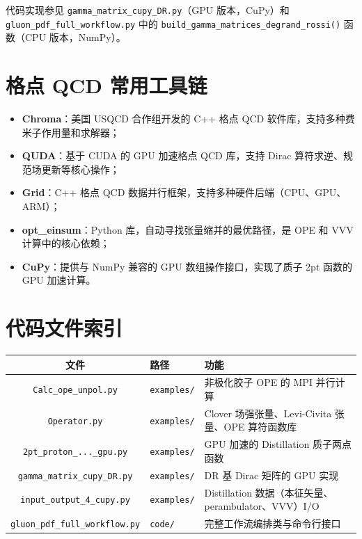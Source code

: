 \documentclass[11pt,a4paper]{ctexart}
\begin{document}
代码实现参见 \texttt{gamma\_matrix\_cupy\_DR.py}（GPU 版本，CuPy）和 \texttt{gluon\_pdf\_full\_workflow.py} 中的 \texttt{build\_gamma\_matrices\_degrand\_rossi()} 函数（CPU 版本，NumPy）。

\section{格点 QCD 常用工具链}

\begin{itemize}
  \item \textbf{Chroma}：美国 USQCD 合作组开发的 C++ 格点 QCD 软件库，支持多种费米子作用量和求解器；
  \item \textbf{QUDA}：基于 CUDA 的 GPU 加速格点 QCD 库，支持 Dirac 算符求逆、规范场更新等核心操作；
  \item \textbf{Grid}：C++ 格点 QCD 数据并行框架，支持多种硬件后端（CPU、GPU、ARM）；
  \item \textbf{opt\_einsum}：Python 库，自动寻找张量缩并的最优路径，是 OPE 和 VVV 计算中的核心依赖；
  \item \textbf{CuPy}：提供与 NumPy 兼容的 GPU 数组操作接口，实现了质子 2pt 函数的 GPU 加速计算。
\end{itemize}

\section{代码文件索引}

\begin{center}
\begin{tabular}{c l p{6cm}}
\toprule
\textbf{文件} & \textbf{路径} & \textbf{功能} \\
\midrule
\texttt{Calc\_ope\_unpol.py} & \texttt{examples/} & 非极化胶子 OPE 的 MPI 并行计算 \\
\texttt{Operator.py} & \texttt{examples/} & Clover 场强张量、Levi-Civita 张量、OPE 算符函数库 \\
\texttt{2pt\_proton\_...\_gpu.py} & \texttt{examples/} & GPU 加速的 Distillation 质子两点函数 \\
\texttt{gamma\_matrix\_cupy\_DR.py} & \texttt{examples/} & DR 基 Dirac 矩阵的 GPU 实现 \\
\texttt{input\_output\_4\_cupy.py} & \texttt{examples/} & Distillation 数据（本征矢量、perambulator、VVV）I/O \\
\texttt{gluon\_pdf\_full\_workflow.py} & \texttt{code/} & 完整工作流编排类与命令行接口 \\
\bottomrule
\end{tabular}
\end{center}
\end{document}

